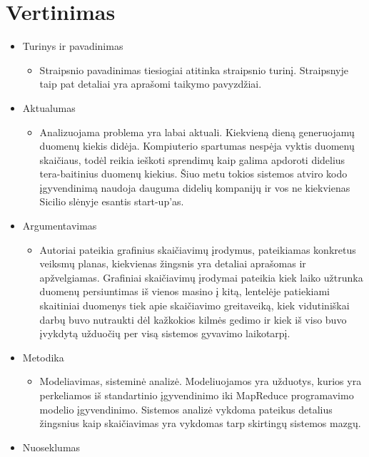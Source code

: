 \documentclass[10pt, onecolumn]{IEEEtran}
\begin{document}
	\section{Vertinimas}

		\begin{itemize}
		\item Turinys ir pavadinimas
	        \begin{itemize}
	          \item Straipsnio pavadinimas tiesiogiai atitinka straipsnio turinį. Straipsnyje taip pat detaliai yra aprašomi taikymo pavyzdžiai.
	        \end{itemize}
	      \item Aktualumas
	        \begin{itemize}
	          \item Analizuojama problema yra labai aktuali. Kiekvieną dieną generuojamų duomenų kiekis didėja. Kompiuterio spartumas nespėja vyktis duomenų skaičiaus, todėl reikia ieškoti sprendimų kaip galima apdoroti didelius tera-baitinius duomenų kiekius. Šiuo metu tokios sistemos atviro kodo įgyvendinimą naudoja dauguma didelių kompanijų ir vos ne kiekvienas Sicilio slėnyje esantis start-up'as.
	        \end{itemize}
	      \item Argumentavimas
	        \begin{itemize}
	          \item Autoriai pateikia grafinius skaičiavimų įrodymus, pateikiamas konkretus veiksmų planas, kiekvienas žingsnis yra detaliai aprašomas ir apžvelgiamas. Grafiniai skaičiavimų įrodymai pateikia kiek laiko užtrunka duomenų persiuntimas iš vienos masino į kitą, lentelėje patiekiami skaitiniai duomenys tiek apie skaičiavimo greitaveiką, kiek vidutiniškai darbų buvo nutraukti dėl kažkokios kilmės gedimo ir kiek iš viso buvo įvykdytą užduočių per visą sistemos gyvavimo laikotarpį.
	        \end{itemize}
	      \item Metodika
	        \begin{itemize}
	          \item Modeliavimas, sisteminė analizė. Modeliuojamos yra užduotys, kurios yra perkeliamos iš standartinio įgyvendinimo iki MapReduce programavimo modelio įgyvendinimo. Sistemos analizė vykdoma pateikus detalius žingsnius kaip skaičiavimas yra vykdomas tarp skirtingų sistemos mazgų.
	        \end{itemize}
	      \item Nuoseklumas

\end{itemize}
\end{document}
